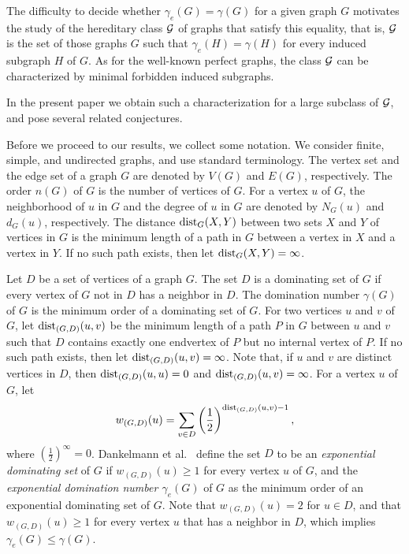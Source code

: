 \documentclass[12pt]{article}
\begin{document}
The difficulty to decide whether $\gamma_e(G)=\gamma(G)$ for a given graph $G$ motivates the study of the hereditary class ${\cal G}$ of graphs that satisfy this equality, that is, 
${\cal G}$ is the set of those graphs $G$ such that $\gamma_e(H)=\gamma(H)$ for every induced subgraph $H$ of $G$.
As for the well-known perfect graphs, the class ${\cal G}$ can be characterized by minimal forbidden induced subgraphs.

In the present paper we obtain such a characterization for a large subclass of ${\cal G}$,
and pose several related conjectures.

\medskip

\noindent Before we proceed to our results, we collect some notation.
We consider finite, simple, and undirected graphs, and use standard terminology.
The vertex set and the edge set of a graph $G$ are denoted by $V(G)$ and $E(G)$, respectively.
The order $n(G)$ of $G$ is the number of vertices of $G$.
For a vertex $u$ of $G$,
the neighborhood of $u$ in $G$
and the degree of $u$ in $G$ are denoted by 
$N_G(u)$ and $d_G(u)$, respectively.
The distance ${\rm dist}_G(X,Y)$ between two sets $X$ and $Y$ of vertices in $G$ is the minimum length of a path in $G$ 
between a vertex in $X$ and a vertex in $Y$.
If no such path exists, then let ${\rm dist}_G(X,Y)=\infty$.

Let $D$ be a set of vertices of a graph $G$.
The set $D$ is a dominating set of $G$ \cite{hhs}
if every vertex of $G$ not in $D$ has a neighbor in $D$.
The domination number $\gamma(G)$ of $G$ is the minimum order of a dominating set of $G$.
For two vertices $u$ and $v$ of $G$,
let ${\rm dist}_{(G,D)}(u,v)$ be the minimum length of a path $P$ in $G$ between $u$ and $v$ 
such that $D$ contains exactly one endvertex of $P$ but no internal vertex of $P$.
If no such path exists, then let ${\rm dist}_{(G,D)}(u,v)=\infty$.
Note that, if $u$ and $v$ are distinct vertices in $D$, 
then ${\rm dist}_{(G,D)}(u,u)=0$ and ${\rm dist}_{(G,D)}(u,v)=\infty$.
For a vertex $u$ of $G$, let 
\begin{eqnarray*}\label{ew}
w_{(G,D)}(u)=\sum\limits_{v\in D}\left(\frac{1}{2}\right)^{{\rm dist}_{(G,D)}(u,v)-1},
\end{eqnarray*}
where $\left(\frac{1}{2}\right)^{\infty}=0$.
Dankelmann et al.~\cite{ddems} define 
the set $D$ to be an {\it exponential dominating set} of $G$ if $w_{(G,D)}(u)\geq 1$ for every vertex $u$ of $G$, 
and the {\it exponential domination number $\gamma_e(G)$} of $G$ 
as the minimum order of an exponential dominating set of $G$.
Note that $w_{(G,D)}(u)=2$ for $u\in D$,
and that $w_{(G,D)}(u)\geq 1$ for every vertex $u$ that has a neighbor in $D$,
which implies $\gamma_e(G)\leq \gamma(G)$.
\end{document}
